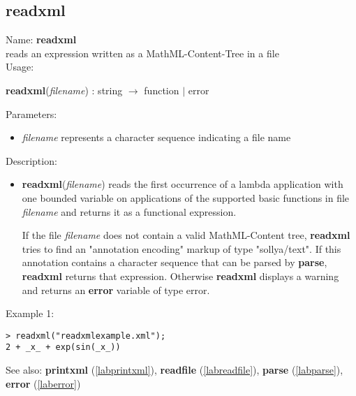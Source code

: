 \subsection{readxml}
\label{labreadxml}
\noindent Name: \textbf{readxml}\\
reads an expression written as a MathML-Content-Tree in a file\\
\noindent Usage: 
\begin{center}
\textbf{readxml}(\emph{filename}) : \textsf{string} $\rightarrow$ \textsf{function} $|$ \textsf{error}\\
\end{center}
Parameters: 
\begin{itemize}
\item \emph{filename} represents a character sequence indicating a file name
\end{itemize}
\noindent Description: \begin{itemize}

\item \textbf{readxml}(\emph{filename}) reads the first occurrence of a lambda
   application with one bounded variable on applications of the supported
   basic functions in file \emph{filename} and returns it as a \sollya
   functional expression.
    
   If the file \emph{filename} does not contain a valid MathML-Content tree,
   \textbf{readxml} tries to find an "annotation encoding" markup of type
   "sollya/text". If this annotation contains a character sequence
   that can be parsed by \textbf{parse}, \textbf{readxml} returns that expression.  Otherwise
   \textbf{readxml} displays a warning and returns an \textbf{error} variable of type
   \textsf{error}.
\end{itemize}
\noindent Example 1: 
\begin{center}\begin{minipage}{15cm}\begin{Verbatim}[frame=single]
> readxml("readxmlexample.xml");
2 + _x_ + exp(sin(_x_))
\end{Verbatim}
\end{minipage}\end{center}
See also: \textbf{printxml} (\ref{labprintxml}), \textbf{readfile} (\ref{labreadfile}), \textbf{parse} (\ref{labparse}), \textbf{error} (\ref{laberror})
